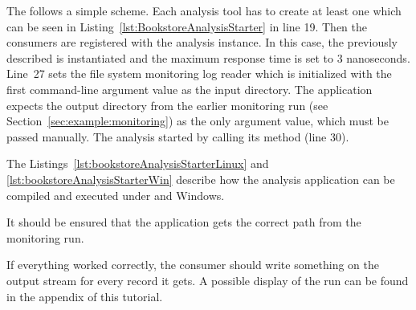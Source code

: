 \noindent The  follows a simple scheme. Each analysis tool has to create at least one  which can be seen in Listing~\ref{lst:BookstoreAnalysisStarter} in line 19. Then the consumers are registered with the analysis instance. In this case, the previously described  is instantiated and the maximum response time is set to 3 nanoseconds. %
Line~27 sets the file system monitoring log reader which is initialized with the first %
command-line argument value as the input directory. The application expects the %
output directory from the earlier monitoring run (see Section~\ref{sec:example:monitoring}) %
as the only argument value, which must be passed manually. %
The analysis started by calling its  method (line 30). %

The Listings~\ref{lst:bookstoreAnalysisStarterLinux} and \ref{lst:bookstoreAnalysisStarterWin} %
describe how the analysis application can be compiled and executed under \UnixLikeSystems{} and Windows.

\setBashListing 		

	
	

It should be ensured that the application gets the correct path from the monitoring run. 

If everything worked correctly, the consumer should write something on the output stream for every record it gets. A possible display of the run can be found in the appendix of this tutorial. 
